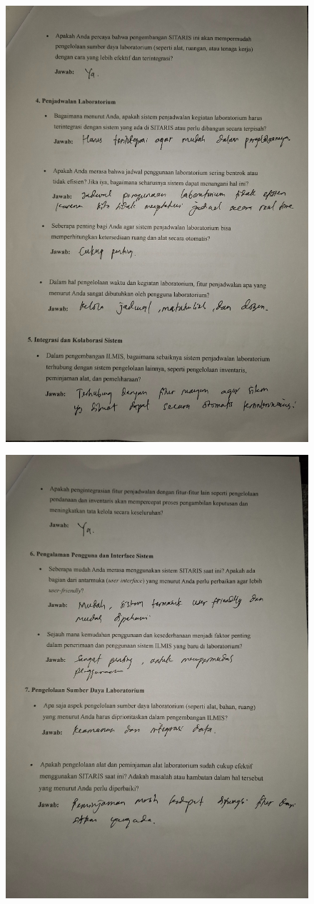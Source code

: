 \begin{figure}[h]
	\centering
	\includegraphics[width=0.82\linewidth]{konten/gambar/wawancara/3.jpg}

	\label{fig:hasil-wawancara}
\end{figure}
\begin{figure}[h]
	\centering
	\includegraphics[width=0.82\linewidth]{konten/gambar/wawancara/4.jpg}

	\label{fig:hasil-wawancara}
\end{figure}
